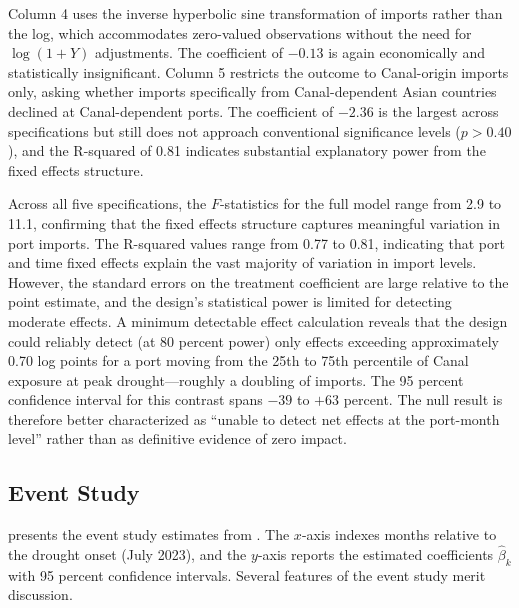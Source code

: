 \documentclass[12pt]{article}
\begin{document}
Column 4 uses the inverse hyperbolic sine transformation of imports rather than the log, which accommodates zero-valued observations without the need for $\log(1 + Y)$ adjustments. The coefficient of $-0.13$ is again economically and statistically insignificant. Column 5 restricts the outcome to Canal-origin imports only, asking whether imports specifically from Canal-dependent Asian countries declined at Canal-dependent ports. The coefficient of $-2.36$ is the largest across specifications but still does not approach conventional significance levels ($p > 0.40$), and the R-squared of 0.81 indicates substantial explanatory power from the fixed effects structure.

Across all five specifications, the $F$-statistics for the full model range from 2.9 to 11.1, confirming that the fixed effects structure captures meaningful variation in port imports. The R-squared values range from 0.77 to 0.81, indicating that port and time fixed effects explain the vast majority of variation in import levels. However, the standard errors on the treatment coefficient are large relative to the point estimate, and the design's statistical power is limited for detecting moderate effects. A minimum detectable effect calculation reveals that the design could reliably detect (at 80 percent power) only effects exceeding approximately 0.70 log points for a port moving from the 25th to 75th percentile of Canal exposure at peak drought---roughly a doubling of imports. The 95 percent confidence interval for this contrast spans $-39$ to $+63$ percent. The null result is therefore better characterized as ``unable to detect net effects at the port-month level'' rather than as definitive evidence of zero impact.



\subsection{Event Study}

 presents the event study estimates from . The $x$-axis indexes months relative to the drought onset (July 2023), and the $y$-axis reports the estimated coefficients $\hat{\beta}_k$ with 95 percent confidence intervals. Several features of the event study merit discussion.
\end{document}
